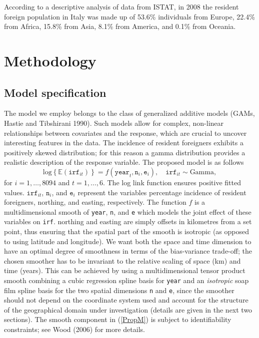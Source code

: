 \documentclass[10pt]{article}
\newcommand{\beq}{\begin{equation}}
\newcommand{\eeq}{\end{equation}}
\newcommand{\E}{\mathbb{E}}
\theoremstyle{definition}
\theoremstyle{plain}
\begin{document}
According to a descriptive analysis of data from ISTAT, in 2008 the resident foreign population in Italy was made up of 53.6\% individuals from Europe, 22.4\% from Africa, 15.8\% from Asia, 8.1\% from America, and 0.1\% from Oceania.

\section{Methodology \label{METH}}

\subsection{Model specification \label{MS}}

The model we employ belongs to the class of generalized additive models (GAMs, Hastie and Tibshirani 1990). Such models allow for complex, non-linear relationships between covariates and the response, which are crucial to uncover interesting features in the data. The incidence of resident foreigners exhibits a positively skewed distribution; for this reason a gamma distribution provides a realistic description of the response variable. The proposed model is as follows
\beq
\text{log}\left\{\E(\texttt{irf}_{it})\right\} = f(\texttt{year}_t,\texttt{n}_i,\texttt{e}_i), \quad \texttt{irf}_{it} \sim \text{Gamma},          
\label{PropM}
\eeq
for $i=1,\ldots,8094$ and $t=1,\ldots,6$. The log link function ensures positive fitted values. $\texttt{irf}_{it}$, $\texttt{n}_i$, and $\texttt{e}_i$ represent the variables percentage incidence of resident foreigners, northing, and easting, respectively. The function $f$ is a multidimensional smooth of \texttt{year}, \texttt{n}, and \texttt{e} which models the joint effect of these variables on \texttt{irf}. northing and easting are simply offsets in kilometres from a set point, thus ensuring that the spatial part of the smooth is isotropic (as opposed to using latitude and longitude). We want both the space and time dimension to have an optimal degree of smoothness in terms of the bias-variance trade-off; the chosen smoother has to be invariant to the relative scaling of space (km) and time (years). This can be achieved by using a multidimensional tensor product smooth combining a cubic regression spline basis for \texttt{year} and an \textit{isotropic} soap film spline basis for the two spatial dimensions \texttt{n} and \texttt{e}, since the smoother should not depend on the coordinate system used and account for the structure of the geographical domain under investigation (details are given in the next two sections). The smooth component in (\ref{PropM}) is subject to identifiability constraints; see Wood (2006) for more details.
\end{document}
